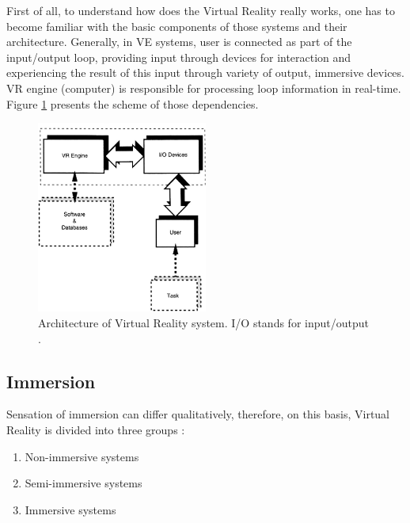 First of all, to understand how does the Virtual Reality really works, one has to become familiar with the basic components of those systems and their architecture. Generally, in VE systems, user is connected as part of the input/output loop, providing input through devices for interaction and experiencing the result of this input through variety of output, immersive devices. VR engine (computer) is responsible for processing loop information in real-time. Figure \ref{fig:architecture} presents the scheme of those dependencies.
\begin{figure}[h]
\centering    
\includegraphics[width=0.5\textwidth]{Figs/architecture.jpg}
\caption{Architecture of Virtual Reality system. I/O stands for input/output \cite{Lange10}.}
\label{fig:architecture} 
\end{figure}
\subsection{Immersion}\label{imm}%
Sensation of immersion can differ qualitatively, therefore, on this basis, Virtual Reality is divided into three groups \cite{Mandal13}:

\begin{enumerate}
\item Non-immersive systems
\item Semi-immersive systems
\item Immersive systems
\end{enumerate}


